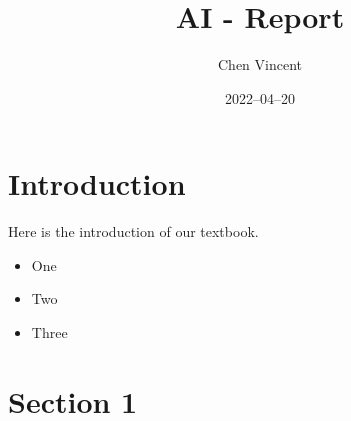 \documentclass[12pt]{article}
\title{AI - Report}
\author{Chen Vincent}
\date{2022–04–20}
\begin{document}
\maketitle

\section{Introduction}

Here is the introduction of our textbook.

\begin{itemize}

\item One

\item Two

\item Three

\end{itemize}

\section{Section 1}
\end{document}
